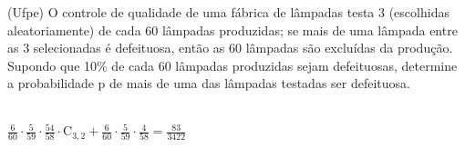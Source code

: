 \begin{ex}
(Ufpe) O controle de qualidade de uma fábrica de lâmpadas testa 3 (escolhidas aleatoriamente) de cada 60 lâmpadas produzidas; se mais de uma lâmpada entre as 3 selecionadas é defeituosa, então as 60 lâmpadas são excluídas da produção. Supondo que 10\% de cada 60 lâmpadas produzidas sejam defeituosas, determine a probabilidade p de mais de uma das lâmpadas testadas ser defeituosa.
  \begin{sol}
   \phantom{A}\\
   $\frac{6}{60}\cdot\frac{5}{59}\cdot\frac{54}{58}\cdot \mathrm{C}_{3,2}+\frac{6}{60}\cdot\frac{5}{59}\cdot\frac{4}{58}=\frac{83}{3422}$
  \end{sol}
\end{ex}
